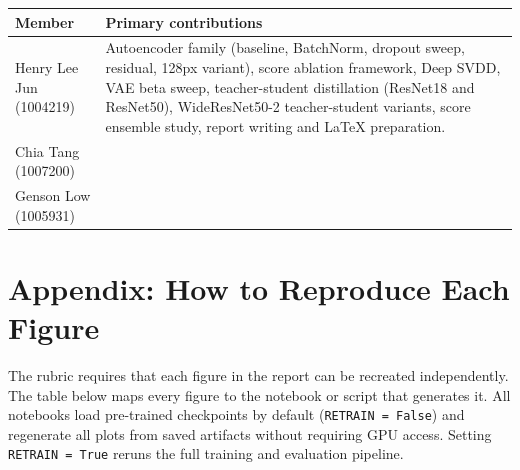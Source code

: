 \documentclass[11pt]{article}
\begin{document}
\begin{tabularx}{\linewidth}{>{\raggedright\arraybackslash}p{3.5cm}>{\raggedright\arraybackslash}X}
\toprule
Member & Primary contributions \\
\midrule
Henry Lee Jun (1004219)
  & Autoencoder family (baseline, BatchNorm, dropout sweep, residual, 128px variant),
    score ablation framework, Deep SVDD, VAE beta sweep, teacher-student distillation
    (ResNet18 and ResNet50), WideResNet50-2 teacher-student variants, score ensemble
    study, report writing and LaTeX preparation. \\
Chia Tang (1007200)
  &  \\
Genson Low (1005931)
  & \\
\bottomrule
\end{tabularx}

\newpage
\section{Appendix: How to Reproduce Each Figure}
\label{app:figures}

The rubric requires that each figure in the report can be recreated independently.
The table below maps every figure to the notebook or script that generates it.
All notebooks load pre-trained checkpoints by default (\texttt{RETRAIN = False})
and regenerate all plots from saved artifacts without requiring GPU access.
Setting \texttt{RETRAIN = True} reruns the full training and evaluation pipeline.
\end{document}
